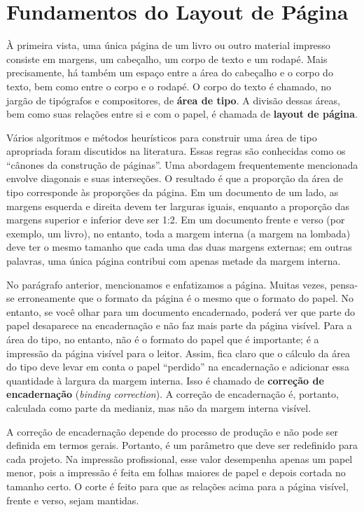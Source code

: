 \chapter{Fundamentos do Layout de Página}
À primeira vista, uma única página de um livro ou outro material impresso consiste em margens, um cabeçalho, um corpo de texto e um rodapé. Mais precisamente, há também um espaço entre a área do cabeçalho e o corpo do texto, bem como entre o corpo e o rodapé. O corpo do texto é chamado, no jargão de tipógrafos e compositores, de \textbf{área de tipo}. A divisão dessas áreas, bem como suas relações entre si e com o papel, é chamada de \textbf{layout de página}.

Vários algoritmos e métodos heurísticos para construir uma área de tipo apropriada foram discutidos na literatura. Essas regras são conhecidas como os “cânones da construção de páginas”. Uma abordagem frequentemente mencionada envolve diagonais e suas interseções. O resultado é que a proporção da área de tipo corresponde às proporções da página. Em um documento de um lado, as margens esquerda e direita devem ter larguras iguais, enquanto a proporção das margens superior e inferior deve ser 1:2. Em um documento frente e verso (por exemplo, um livro), no entanto, toda a margem interna (a margem na lombada) deve ter o mesmo tamanho que cada uma das duas margens externas; em outras palavras, uma única página contribui com apenas metade da margem interna.

No parágrafo anterior, mencionamos e enfatizamos a página. Muitas vezes, pensa-se erroneamente que o formato da página é o mesmo que o formato do papel. No entanto, se você olhar para um documento encadernado, poderá ver que parte do papel desaparece na encadernação e não faz mais parte da página visível. Para a área do tipo, no entanto, não é o formato do papel que é importante; é a impressão da página visível para o leitor. Assim, fica claro que o cálculo da área do tipo deve levar em conta o papel “perdido” na encadernação e adicionar essa quantidade à largura da margem interna. Isso é chamado de \textbf{correção de encadernação} (\textit{binding correction}). A correção de encadernação é, portanto, calculada como parte da medianiz, mas não da margem interna visível.

A correção de encadernação depende do processo de produção e não pode ser definida em termos gerais. Portanto, é um parâmetro que deve ser redefinido para cada projeto. Na impressão profissional, esse valor desempenha apenas um papel menor, pois a impressão é feita em folhas maiores de papel e depois cortada no tamanho certo. O corte é feito para que as relações acima para a página visível, frente e verso, sejam mantidas.

